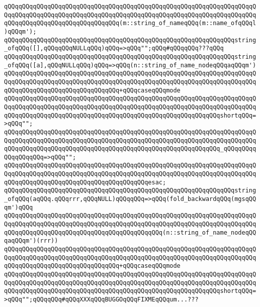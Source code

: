 \verb|qQQqqQQqqQQqqQQqqQQqqQQqqQQqqQQqqQQqqQQqqQQqqQQqqQQqqQQqqQQqqQQqqQQqqQQqqQQqqQQqqQQqqQQqqQQqqQQqqQQqqQQqqQQqqQQqqQQqqQQqqQQqqQQqqQQqqQQqqQQqqQQqqQQqqQQqqQQqqQQqqQQqqQQqqQQq(m::string_of_nameqQQq(m::name_ofqQQql)qQQqm');|\newline
\verb|qQQqqQQqqQQqqQQqqQQqqQQqqQQqqQQqqQQqqQQqqQQqqQQqqQQqqQQqqQQqqQQqstring_ofqQQq([],qQQqqQQqNULLqQQq)qQQq=>qQQq"";qQQq#qQQqqQQq???qQQq|\newline
\verb|qQQqqQQqqQQqqQQqqQQqqQQqqQQqqQQqqQQqqQQqqQQqqQQqqQQqqQQqqQQqqQQqstring_ofqQQq([a],qQQqNULLqQQq)qQQq=>qQQq(n::string_of_name_nodeqQQqaqQQqm')|\newline
\verb|qQQqqQQqqQQqqQQqqQQqqQQqqQQqqQQqqQQqqQQqqQQqqQQqqQQqqQQqqQQqqQQqqQQqqQQqqQQqqQQqqQQqqQQqqQQqqQQqqQQqqQQqqQQqqQQqqQQqqQQqqQQqqQQqqQQqqQQqqQQqqQQqqQQqqQQqqQQqqQQqqQQqqQQqqQQq+qQQqcaseqQQqmode|\newline
\newline
\verb|qQQqqQQqqQQqqQQqqQQqqQQqqQQqqQQqqQQqqQQqqQQqqQQqqQQqqQQqqQQqqQQqqQQqqQQqqQQqqQQqqQQqqQQqqQQqqQQqqQQqqQQqqQQqqQQqqQQqqQQqqQQqqQQqqQQqqQQqqQQqqQQqqQQqqQQqqQQqqQQqqQQqqQQqqQQqqQQqqQQqqQQqqQQqqQQqqQQqqQQqshortqQQq=>qQQq"";|\newline
\verb|qQQqqQQqqQQqqQQqqQQqqQQqqQQqqQQqqQQqqQQqqQQqqQQqqQQqqQQqqQQqqQQqqQQqqQQqqQQqqQQqqQQqqQQqqQQqqQQqqQQqqQQqqQQqqQQqqQQqqQQqqQQqqQQqqQQqqQQqqQQqqQQqqQQqqQQqqQQqqQQqqQQqqQQqqQQqqQQqqQQqqQQqqQQqqQQqqQQqqQQq_qQQqqQQqqQQqqQQqqQQq=>qQQq"";|\newline
\verb|qQQqqQQqqQQqqQQqqQQqqQQqqQQqqQQqqQQqqQQqqQQqqQQqqQQqqQQqqQQqqQQqqQQqqQQqqQQqqQQqqQQqqQQqqQQqqQQqqQQqqQQqqQQqqQQqqQQqqQQqqQQqqQQqqQQqqQQqqQQqqQQqqQQqqQQqqQQqqQQqqQQqqQQqqQQqqQQqqQQqesac;|\newline
\newline
\verb|qQQqqQQqqQQqqQQqqQQqqQQqqQQqqQQqqQQqqQQqqQQqqQQqqQQqqQQqqQQqqQQqstring_ofqQQq(aqQQq.qQQqrrr,qQQqNULL)qQQqqQQq=>qQQq(fold_backwardqQQq(mgsqQQqm')qQQq|\newline
\verb|qQQqqQQqqQQqqQQqqQQqqQQqqQQqqQQqqQQqqQQqqQQqqQQqqQQqqQQqqQQqqQQqqQQqqQQqqQQqqQQqqQQqqQQqqQQqqQQqqQQqqQQqqQQqqQQqqQQqqQQqqQQqqQQqqQQqqQQqqQQqqQQqqQQqqQQqqQQqqQQqqQQqqQQqqQQqqQQqqQQqqQQq(n::string_of_name_nodeqQQqaqQQqm')(rrr))|\newline
\verb|qQQqqQQqqQQqqQQqqQQqqQQqqQQqqQQqqQQqqQQqqQQqqQQqqQQqqQQqqQQqqQQqqQQqqQQqqQQqqQQqqQQqqQQqqQQqqQQqqQQqqQQqqQQqqQQqqQQqqQQqqQQqqQQqqQQqqQQqqQQqqQQqqQQqqQQqqQQqqQQqqQQqqQQqqQQq+qQQqcaseqQQqmode|\newline
\verb|qQQqqQQqqQQqqQQqqQQqqQQqqQQqqQQqqQQqqQQqqQQqqQQqqQQqqQQqqQQqqQQqqQQqqQQqqQQqqQQqqQQqqQQqqQQqqQQqqQQqqQQqqQQqqQQqqQQqqQQqqQQqqQQqqQQqqQQqqQQqqQQqqQQqqQQqqQQqqQQqqQQqqQQqqQQqqQQqqQQqqQQqqQQqqQQqqQQqqQQqshortqQQq=>qQQq"";qQQqqQQq#qQQqXXXqQQqBUGGOqQQqFIXMEqQQqum...???|\newline
